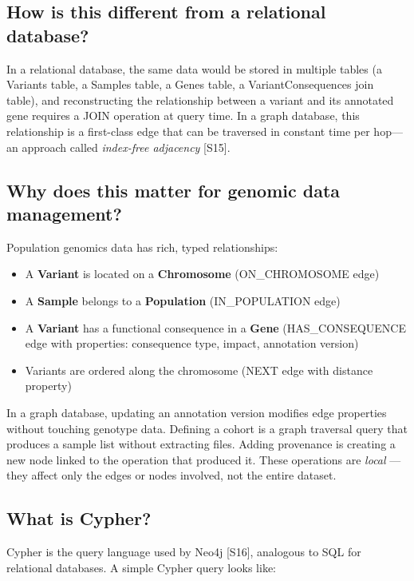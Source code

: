 \documentclass[11pt,a4paper]{article}
\begin{document}
\subsection*{How is this different from a relational database?}

In a relational database, the same data would be stored in multiple tables (a Variants table, a Samples table, a Genes table, a VariantConsequences join table), and reconstructing the relationship between a variant and its annotated gene requires a JOIN operation at query time. In a graph database, this relationship is a first-class edge that can be traversed in constant time per hop---an approach called \textit{index-free adjacency} [S15].

\subsection*{Why does this matter for genomic data management?}

Population genomics data has rich, typed relationships:

\begin{itemize}
\item A \textbf{Variant} is located on a \textbf{Chromosome} (ON\_CHROMOSOME edge)
\item A \textbf{Sample} belongs to a \textbf{Population} (IN\_POPULATION edge)
\item A \textbf{Variant} has a functional consequence in a \textbf{Gene} (HAS\_CONSEQUENCE edge with properties: consequence type, impact, annotation version)
\item Variants are ordered along the chromosome (NEXT edge with distance property)
\end{itemize}

In a graph database, updating an annotation version modifies edge properties without touching genotype data. Defining a cohort is a graph traversal query that produces a sample list without extracting files. Adding provenance is creating a new node linked to the operation that produced it. These operations are \textit{local} --- they affect only the edges or nodes involved, not the entire dataset.

\subsection*{What is Cypher?}

Cypher is the query language used by Neo4j [S16], analogous to SQL for relational databases. A simple Cypher query looks like:
\end{document}
